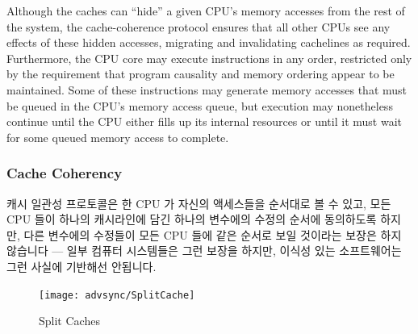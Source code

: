 \begin{enumerate}
Although the caches can ``hide'' a given CPU's memory accesses from the rest of
the system, the cache-coherence protocol ensures that all other CPUs see
any effects of these hidden accesses, migrating and invalidating cachelines
as required.
Furthermore, the CPU core may execute instructions in any order, restricted
only by the requirement that program causality and memory ordering
appear to be maintained.
Some of these instructions may generate memory accesses that must be queued
in the CPU's memory access queue, but execution may nonetheless continue
until the CPU either fills up its internal resources or until it must
wait for some queued memory access to complete.
\fi

\subsubsection{Cache Coherency}
\label{sec:advsync:Cache Coherency}

캐시 일관성 프로토콜은 한 CPU 가 자신의 액세스들을 순서대로 볼 수 있고, 모든
CPU 들이 하나의 캐시라인에 담긴 하나의 변수에의 수정의 순서에 동의하도록
하지만, 다른 변수에의 수정들이 모든 CPU 들에 같은 순서로 보일 것이라는 보장은
하지 않습니다 --- 일부 컴퓨터 시스템들은 그런 보장을 하지만, 이식성 있는
소프트웨어는 그런 사실에 기반해선 안됩니다.

\begin{figure}[htb]
\begin{center}
\texttt{[image: advsync/SplitCache]}
\end{center}
\caption{Split Caches}
\end{figure}


\end{enumerate}
